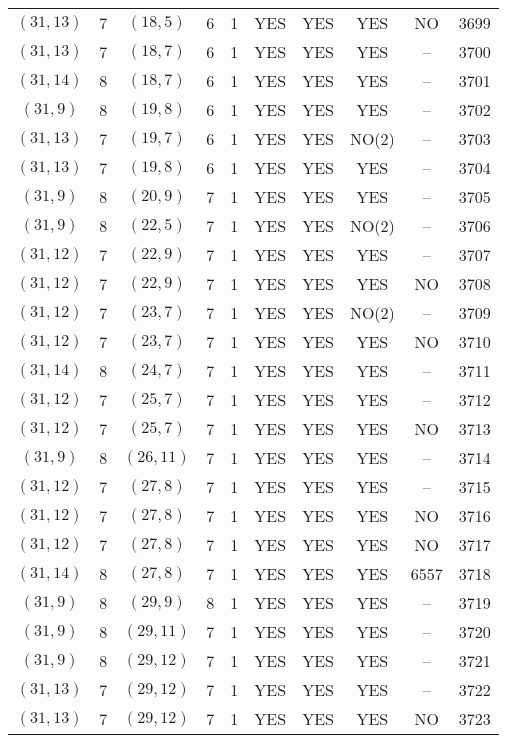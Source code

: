 \begin{longtable}{|c|c|c|c|c|c|c|c|c|c|}
$(31, 13)$ & 7 & $(18, 5)$ & 6 & 1 & YES & YES & YES & NO & 3699\\
$(31, 13)$ & 7 & $(18, 7)$ & 6 & 1 & YES & YES & YES & -- & 3700\\
$(31, 14)$ & 8 & $(18, 7)$ & 6 & 1 & YES & YES & YES & -- & 3701\\
$(31, 9)$ & 8 & $(19, 8)$ & 6 & 1 & YES & YES & YES & -- & 3702\\
$(31, 13)$ & 7 & $(19, 7)$ & 6 & 1 & YES & YES & NO(2) & -- & 3703\\
$(31, 13)$ & 7 & $(19, 8)$ & 6 & 1 & YES & YES & YES & -- & 3704\\
$(31, 9)$ & 8 & $(20, 9)$ & 7 & 1 & YES & YES & YES & -- & 3705\\
$(31, 9)$ & 8 & $(22, 5)$ & 7 & 1 & YES & YES & NO(2) & -- & 3706\\
$(31, 12)$ & 7 & $(22, 9)$ & 7 & 1 & YES & YES & YES & -- & 3707\\
$(31, 12)$ & 7 & $(22, 9)$ & 7 & 1 & YES & YES & YES & NO & 3708\\
$(31, 12)$ & 7 & $(23, 7)$ & 7 & 1 & YES & YES & NO(2) & -- & 3709\\
$(31, 12)$ & 7 & $(23, 7)$ & 7 & 1 & YES & YES & YES & NO & 3710\\
$(31, 14)$ & 8 & $(24, 7)$ & 7 & 1 & YES & YES & YES & -- & 3711\\
$(31, 12)$ & 7 & $(25, 7)$ & 7 & 1 & YES & YES & YES & -- & 3712\\
$(31, 12)$ & 7 & $(25, 7)$ & 7 & 1 & YES & YES & YES & NO & 3713\\
$(31, 9)$ & 8 & $(26, 11)$ & 7 & 1 & YES & YES & YES & -- & 3714\\
$(31, 12)$ & 7 & $(27, 8)$ & 7 & 1 & YES & YES & YES & -- & 3715\\
$(31, 12)$ & 7 & $(27, 8)$ & 7 & 1 & YES & YES & YES & NO & 3716\\
$(31, 12)$ & 7 & $(27, 8)$ & 7 & 1 & YES & YES & YES & NO & 3717\\
$(31, 14)$ & 8 & $(27, 8)$ & 7 & 1 & YES & YES & YES & 6557 & 3718\\
$(31, 9)$ & 8 & $(29, 9)$ & 8 & 1 & YES & YES & YES & -- & 3719\\
$(31, 9)$ & 8 & $(29, 11)$ & 7 & 1 & YES & YES & YES & -- & 3720\\
$(31, 9)$ & 8 & $(29, 12)$ & 7 & 1 & YES & YES & YES & -- & 3721\\
$(31, 13)$ & 7 & $(29, 12)$ & 7 & 1 & YES & YES & YES & -- & 3722\\
$(31, 13)$ & 7 & $(29, 12)$ & 7 & 1 & YES & YES & YES & NO & 3723\\

\end{longtable}
